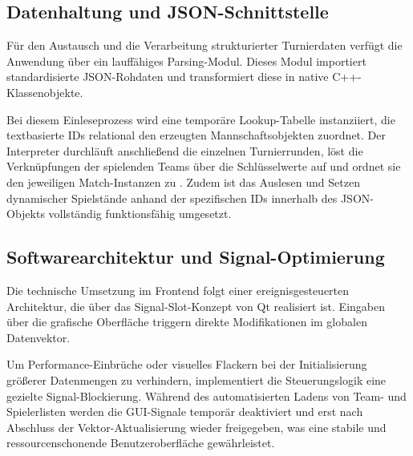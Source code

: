 \subsection{Datenhaltung und JSON-Schnittstelle}
Für den Austausch und die Verarbeitung strukturierter Turnierdaten verfügt die Anwendung über ein lauffähiges Parsing-Modul. Dieses Modul importiert standardisierte JSON-Rohdaten und transformiert diese in native C++-Klassenobjekte. 

Bei diesem Einleseprozess wird eine temporäre Lookup-Tabelle instanziiert, die textbasierte IDs relational den erzeugten Mannschaftsobjekten zuordnet. Der Interpreter durchläuft anschließend die einzelnen Turnierrunden, löst die Verknüpfungen der spielenden Teams über die Schlüsselwerte auf und ordnet sie den jeweiligen Match-Instanzen zu . Zudem ist das Auslesen und Setzen dynamischer Spielstände anhand der spezifischen IDs innerhalb des JSON-Objekts vollständig funktionsfähig umgesetzt.

\subsection{Softwarearchitektur und Signal-Optimierung}
Die technische Umsetzung im Frontend folgt einer ereignisgesteuerten Architektur, die über das Signal-Slot-Konzept von Qt realisiert ist. Eingaben über die grafische Oberfläche triggern direkte Modifikationen im globalen Datenvektor. 

Um Performance-Einbrüche oder visuelles Flackern bei der Initialisierung größerer Datenmengen zu verhindern, implementiert die Steuerungslogik eine gezielte Signal-Blockierung. Während des automatisierten Ladens von Team- und Spielerlisten werden die GUI-Signale temporär deaktiviert und erst nach Abschluss der Vektor-Aktualisierung wieder freigegeben, was eine stabile und ressourcenschonende Benutzeroberfläche gewährleistet.
